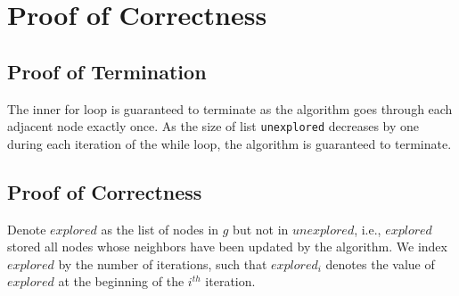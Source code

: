 \documentclass[11pt, oneside]{article}   	%
\theoremstyle{definition}
\begin{document}
\section{Proof of Correctness}
\subsection{Proof of Termination}
The inner for loop is guaranteed to terminate as the algorithm goes through each adjacent node exactly once. As the size of list \texttt{unexplored} decreases by one during each iteration of the while loop, the algorithm is guaranteed to terminate. 


\subsection{Proof of Correctness}
Denote $explored$ as the list of nodes in $g$ but not in $unexplored$, i.e., $explored$ stored all nodes whose neighbors have been updated by the algorithm. We index $explored$ by the number of iterations, such that $explored_i$ denotes the value of $explored$ at the beginning of the $i^{th}$ iteration.
\end{document}
